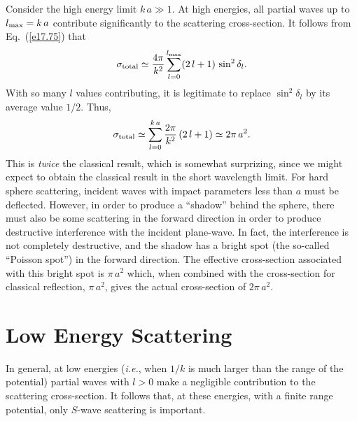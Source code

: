 Consider the high energy limit $k\,a\gg 1$. At high energies, all partial
waves up to $l_{\rm max} = k\,a$ contribute significantly to
the scattering cross-section. It follows from Eq.~(\ref{e17.75}) that
\begin{equation}\label{e17.99}
\sigma_{\rm total} \simeq \frac{4\pi}{k^2} \sum_{l=0}^{l_{\rm max}}
(2\,l+1)\,\sin^2\delta_l.
\end{equation}
With so many $l$ values contributing, it is legitimate to replace
$\sin^2\delta_l$ by its average value $1/2$. Thus,
\begin{equation}
\sigma_{\rm total} \simeq \sum_{l=0}^{k\,a} \frac{2\pi}{k^2} \,(2\,l+1) \simeq 
2\pi \,a^2.
\end{equation}
This is {\em twice}\/ the classical result, which is  somewhat surprizing,
since we might expect to obtain the classical result in the short
wavelength limit. For hard sphere scattering, incident waves with
impact parameters less than $a$ must be deflected. However, in order to
produce a ``shadow'' behind the sphere, there must also be  some scattering
in the forward direction in order to produce
destructive interference with the incident plane-wave. In fact, the
interference is not completely destructive, and the shadow has a bright
spot (the so-called ``Poisson spot'') in the forward direction. The effective cross-section associated with
this bright spot is $\pi \,a^2$ which, when combined with the
cross-section for classical reflection, $\pi \,a^2$, gives the actual
cross-section of $2\pi \,a^2$.

\section{Low Energy Scattering}
In general, at low energies ({\em i.e.}, when $1/k$ is much larger than the range
of the potential) partial waves with $l>0$ make a
negligible contribution to the scattering cross-section. It follows
that, at these energies, with a finite range potential, only $S$-wave
scattering is important.

